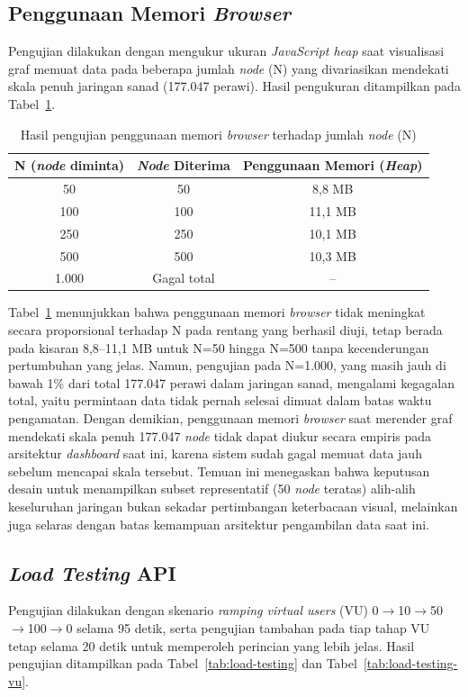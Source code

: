 \subsection{Penggunaan Memori \textit{Browser}}
Pengujian dilakukan dengan mengukur ukuran \textit{JavaScript heap} saat visualisasi graf memuat data pada beberapa jumlah \textit{node} (N) yang divariasikan mendekati skala penuh jaringan sanad (177.047 perawi). Hasil pengukuran ditampilkan pada Tabel~\ref{tab:memori}.

\begin{table}[H]
\centering
\caption{Hasil pengujian penggunaan memori \textit{browser} terhadap jumlah \textit{node} (N)}
\label{tab:memori}
\renewcommand{\arraystretch}{1.3}
\begin{tabular}{|c|c|c|}
\hline
\textbf{N (\textit{node} diminta)} & \textbf{\textit{Node} Diterima} & \textbf{Penggunaan Memori (\textit{Heap})} \\
\hline
50 & 50 & 8,8 MB \\
\hline
100 & 100 & 11,1 MB \\
\hline
250 & 250 & 10,1 MB \\
\hline
500 & 500 & 10,3 MB \\
\hline
1.000 & Gagal total & -- \\
\hline
\end{tabular}
\end{table}

Tabel~\ref{tab:memori} menunjukkan bahwa penggunaan memori \textit{browser} tidak meningkat secara proporsional terhadap N pada rentang yang berhasil diuji, tetap berada pada kisaran 8,8--11,1 MB untuk N=50 hingga N=500 tanpa kecenderungan pertumbuhan yang jelas. Namun, pengujian pada N=1.000, yang masih jauh di bawah 1\% dari total 177.047 perawi dalam jaringan sanad, mengalami kegagalan total, yaitu permintaan data tidak pernah selesai dimuat dalam batas waktu pengamatan. Dengan demikian, penggunaan memori \textit{browser} saat merender graf mendekati skala penuh 177.047 \textit{node} tidak dapat diukur secara empiris pada arsitektur \textit{dashboard} saat ini, karena sistem sudah gagal memuat data jauh sebelum mencapai skala tersebut. Temuan ini menegaskan bahwa keputusan desain untuk menampilkan subset representatif (50 \textit{node} teratas) alih-alih keseluruhan jaringan bukan sekadar pertimbangan keterbacaan visual, melainkan juga selaras dengan batas kemampuan arsitektur pengambilan data saat ini.

\subsection{\textit{Load Testing} API}
Pengujian dilakukan dengan skenario \textit{ramping virtual users} (VU) 0$\rightarrow$10$\rightarrow$50\allowbreak$\rightarrow$100$\rightarrow$0 selama 95 detik, serta pengujian tambahan pada tiap tahap VU tetap selama 20 detik untuk memperoleh perincian yang lebih jelas. Hasil pengujian ditampilkan pada Tabel~\ref{tab:load-testing} dan Tabel~\ref{tab:load-testing-vu}.

